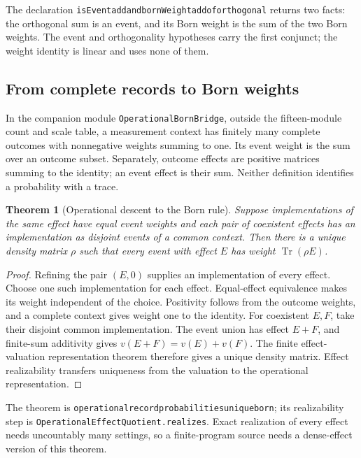 \documentclass[11pt]{article}
\renewcommand{\_}{\textunderscore\allowbreak}
\newtheorem{theorem}{Theorem}
\theoremstyle{remark}
\newcommand{\Tr}{\operatorname{Tr}}
\begin{document}
The declaration
\texttt{isEvent\_add\_and\_bornWeight\_add\_of\_orthogonal} returns two facts:
the orthogonal sum is an event, and its Born weight is the sum of the two Born
weights. The event and orthogonality hypotheses carry the first conjunct; the
weight identity is linear and uses none of them.

\subsection{From complete records to Born weights}

In the companion module \texttt{OperationalBornBridge}, outside the
fifteen-module count and scale table, a measurement context has finitely many
complete outcomes with nonnegative weights summing to one. Its event weight
is the sum over an outcome subset. Separately, outcome effects are positive
matrices summing to the identity; an event effect is their sum. Neither
definition identifies a probability with a trace.

\begin{theorem}[Operational descent to the Born rule]
Suppose implementations of the same effect have equal event weights and
each pair of coexistent effects has an implementation as disjoint events
of a common context. Then there
is a unique density matrix $\rho$ such that every event with effect $E$
has weight $\Tr(\rho E)$.
\end{theorem}
\begin{proof}
Refining the pair $(E,0)$ supplies an implementation of every effect.
Choose one such implementation for each effect. Equal-effect equivalence makes
its weight independent of the choice. Positivity follows from the outcome
weights, and a complete context gives weight one to the identity. For
coexistent $E,F$, take their disjoint common implementation. The event
union has effect $E+F$, and finite-sum additivity gives
$v(E+F)=v(E)+v(F)$. The finite effect-valuation representation theorem
therefore gives a unique density matrix. Effect realizability transfers
uniqueness from the valuation to the operational representation.
\end{proof}

The theorem is \texttt{operational\_record\_probabilities\_unique\_born}; its
realizability step is
\texttt{Operational\allowbreak Effect\allowbreak Quotient.\allowbreak realizes}. Exact
realization of every effect needs uncountably many settings, so a finite-program
source needs a dense-effect version of this theorem.
\end{document}
